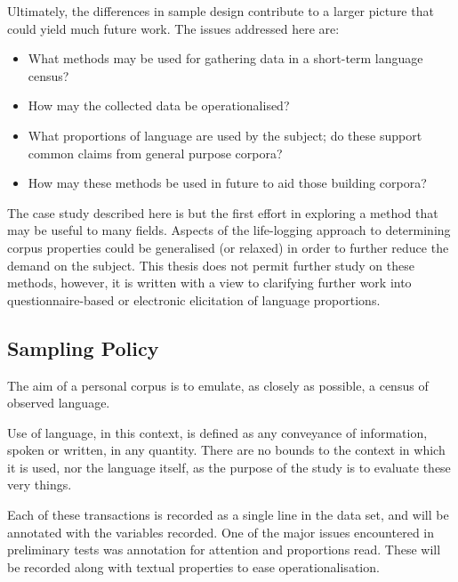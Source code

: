 
Ultimately, the differences in sample design contribute to a larger picture that could yield much future work.  The issues addressed here are:

\begin{itemize}
    \item What methods may be used for gathering data in a short-term language census?
    \item How may the collected data be operationalised?
    \item What proportions of language are used by the subject; do these support common claims from general purpose corpora?
    \item How may these methods be used in future to aid those building corpora?
\end{itemize}


The case study described here is but the first effort in exploring a method that may be useful to many fields.  Aspects of the life-logging approach to determining corpus properties could be generalised (or relaxed) in order to further reduce the demand on the subject.  This thesis does not permit further study on these methods, however, it is written with a view to clarifying further work into questionnaire-based or electronic elicitation of language proportions.






\subsection{Sampling Policy}
\label{sec:personal:samplingpolicy}
The aim of a personal corpus is to emulate, as closely as possible, a census of observed language.

Use of language, in this context, is defined as any conveyance of information, spoken or written, in any quantity. There are no bounds to the context in which it is used, nor the language itself, as the purpose of the study is to evaluate these very things.

Each of these transactions is recorded as a single line in the data set, and will be annotated with the variables recorded.  One of the major issues encountered in preliminary tests was annotation for attention and proportions read.  These will be recorded along with textual properties to ease operationalisation.

